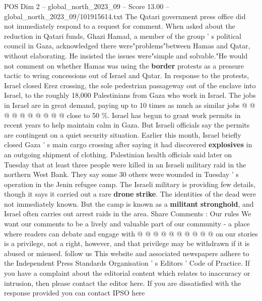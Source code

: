 \begin{textsample}{POS Dim 2 – global\_north\_2023\_09 – Score 13.00 – global\_north\_2023\_09/101915614.txt}
The Qatari government press office did not immediately respond to a request for comment.
When asked about the reduction in Qatari funds, Ghazi Hamad, a member of the group ' s political council in Gaza, acknowledged there were"problems"between Hamas and Qatar, without elaborating.
He insisted the issues were"simple and solvable."He would not comment on whether Hamas was using the \textbf{border} protests as a pressure tactic to wring concessions out of Israel and Qatar.
In response to the protests, Israel closed Erez crossing, the sole pedestrian passageway out of the enclave into Israel, to the roughly 18,000 Palestinians from Gaza who work in Israel.
The jobs in Israel are in great demand, paying up to 10 times as much as similar jobs @ @ @ @ @ @ @ @ @ @ close to 50 \%.
Israel has begun to grant work permits in recent years to help maintain calm in Gaza.
But Israeli officials say the permits are contingent on a quiet security situation.
Earlier this month, Israel briefly closed Gaza ' s main cargo crossing after saying it had discovered \textbf{explosives} in an outgoing shipment of clothing.
Palestinian health officials said later on Tuesday that at least three people were killed in an Israeli military raid in the northern West Bank.
They say some 30 others were wounded in Tuesday ' s operation in the Jenin refugee camp.
The Israeli military is providing few details, though it says it carried out a rare \textbf{drone} \textbf{strike}.
The identities of the dead were not immediately known.
But the camp is known as a \textbf{militant} \textbf{stronghold}, and Israel often carries out arrest raids in the area.
Share Comments : Our rules We want our comments to be a lively and valuable part of our community - a place where readers can debate and engage with @ @ @ @ @ @ @ @ @ @ on our stories is a privilege, not a right, however, and that privilege may be withdrawn if it is abused or misused. follow us This website and associated newspapers adhere to the Independent Press Standards Organisation ' s Editors ' Code of Practice.
If you have a complaint about the editorial content which relates to inaccuracy or intrusion, then please contact the editor here.
If you are dissatisfied with the response provided you can contact IPSO here

\end{textsample}
